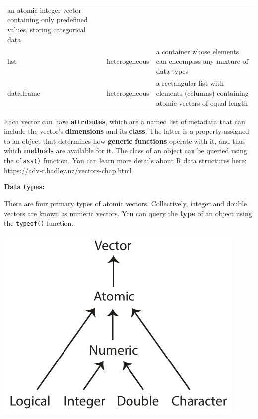 \documentclass[
]{book}
\begin{document}
\begin{longtable}[]{@{}lll@{}}
\begin{minipage}[t]{0.71\columnwidth}
an atomic integer vector containing only predefined values, storing categorical data\strut
\end{minipage}\tabularnewline
\begin{minipage}[t]{0.10\columnwidth}\raggedright
list\strut
\end{minipage} & \begin{minipage}[t]{0.10\columnwidth}\raggedright
heterogeneous\strut
\end{minipage} & \begin{minipage}[t]{0.71\columnwidth}\raggedright
a container whose elements can encompass any mixture of data types\strut
\end{minipage}\tabularnewline
\begin{minipage}[t]{0.10\columnwidth}\raggedright
data.frame\strut
\end{minipage} & \begin{minipage}[t]{0.10\columnwidth}\raggedright
heterogeneous\strut
\end{minipage} & \begin{minipage}[t]{0.71\columnwidth}\raggedright
a rectangular list with elements (columns) containing atomic vectors of equal length\strut
\end{minipage}\tabularnewline
\bottomrule
\end{longtable}

Each vector can have \textbf{attributes}, which are a named list of metadata that can include the vector's \textbf{dimensions} and its \textbf{class}. The latter is a property assigned to an object that determines how \textbf{generic functions} operate with it, and thus which \textbf{methods} are available for it. The class of an object can be queried using the \texttt{class()} function. You can learn more details about R data structures here: \url{https://adv-r.hadley.nz/vectors-chap.html}

\textbf{Data types:}

There are four primary types of atomic vectors. Collectively, integer and double vectors are known as numeric vectors. You can query the \textbf{type} of an object using the \texttt{typeof()} function.

\includegraphics{R/RDataWrangling/images/summary_tree_atomic.png}
\end{document}
